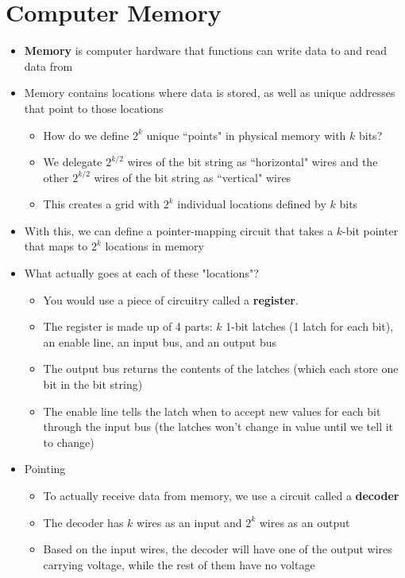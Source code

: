 \documentclass{article}
\begin{document}
\section{Computer Memory}
\begin{itemize}
	\item \textbf{Memory} is computer hardware that functions can write data to and read data from
	\item Memory contains locations where data is stored, as well as unique addresses that point to those locations
		\begin{itemize}
			\item How do we define $2^k$ unique ``points" in physical memory with $k$ bits?
			\item We delegate $2^{{k}/{2}}$ wires of the bit string as ``horizontal" wires and the other $2^{k/2}$ wires of the bit string as ``vertical" wires
			\item This creates a grid with $2^k$ individual locations defined by $k$ bits
		\end{itemize}
	\item With this, we can define a pointer-mapping circuit that takes a $k$-bit pointer that maps to $2^k$ locations in memory
	\item What actually goes at each of these "locations"?
		\begin{itemize}
			\item You would use a piece of circuitry called a \textbf{register}.
			\item The register is made up of 4 parts: $k$ 1-bit latches (1 latch for each bit), an enable line, an input bus, and an output bus
			\item The output bus returns the contents of the latches (which each store one bit in the bit string)
			\item The enable line tells the latch when to accept new values for each bit through the input bus (the latches won't change in value until we tell it to change)
		\end{itemize}
	\item Pointing
		\begin{itemize}
			\item To actually receive data from memory, we use a circuit called a \textbf{decoder}
			\item The decoder has $k$ wires as an input and $2^k$ wires as an output
			\item Based on the input wires, the decoder will have one of the output wires carrying voltage, while the rest of them have no voltage

\end{itemize}
\end{itemize}
\end{document}
